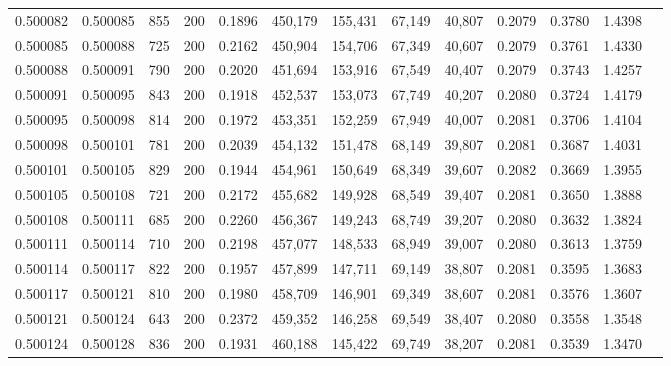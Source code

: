 \begin{tabular}{rrrrrrrrrrrrr}
0.500082 & 0.500085 &   855 & 200 &                                     0.1896 & 450,179 & 155,431 &  67,149 &  40,807 & 0.2079 & 0.3780 & 1.4398 \\
0.500085 & 0.500088 &   725 & 200 &                                     0.2162 & 450,904 & 154,706 &  67,349 &  40,607 & 0.2079 & 0.3761 & 1.4330 \\
0.500088 & 0.500091 &   790 & 200 &                                     0.2020 & 451,694 & 153,916 &  67,549 &  40,407 & 0.2079 & 0.3743 & 1.4257 \\
0.500091 & 0.500095 &   843 & 200 &                                     0.1918 & 452,537 & 153,073 &  67,749 &  40,207 & 0.2080 & 0.3724 & 1.4179 \\
0.500095 & 0.500098 &   814 & 200 &                                     0.1972 & 453,351 & 152,259 &  67,949 &  40,007 & 0.2081 & 0.3706 & 1.4104 \\
0.500098 & 0.500101 &   781 & 200 &                                     0.2039 & 454,132 & 151,478 &  68,149 &  39,807 & 0.2081 & 0.3687 & 1.4031 \\
0.500101 & 0.500105 &   829 & 200 &                                     0.1944 & 454,961 & 150,649 &  68,349 &  39,607 & 0.2082 & 0.3669 & 1.3955 \\
0.500105 & 0.500108 &   721 & 200 &                                     0.2172 & 455,682 & 149,928 &  68,549 &  39,407 & 0.2081 & 0.3650 & 1.3888 \\
0.500108 & 0.500111 &   685 & 200 &                                     0.2260 & 456,367 & 149,243 &  68,749 &  39,207 & 0.2080 & 0.3632 & 1.3824 \\
0.500111 & 0.500114 &   710 & 200 &                                     0.2198 & 457,077 & 148,533 &  68,949 &  39,007 & 0.2080 & 0.3613 & 1.3759 \\
0.500114 & 0.500117 &   822 & 200 &                                     0.1957 & 457,899 & 147,711 &  69,149 &  38,807 & 0.2081 & 0.3595 & 1.3683 \\
0.500117 & 0.500121 &   810 & 200 &                                     0.1980 & 458,709 & 146,901 &  69,349 &  38,607 & 0.2081 & 0.3576 & 1.3607 \\
0.500121 & 0.500124 &   643 & 200 &                                     0.2372 & 459,352 & 146,258 &  69,549 &  38,407 & 0.2080 & 0.3558 & 1.3548 \\
0.500124 & 0.500128 &   836 & 200 &                                     0.1931 & 460,188 & 145,422 &  69,749 &  38,207 & 0.2081 & 0.3539 & 1.3470 \\

\end{tabular}
